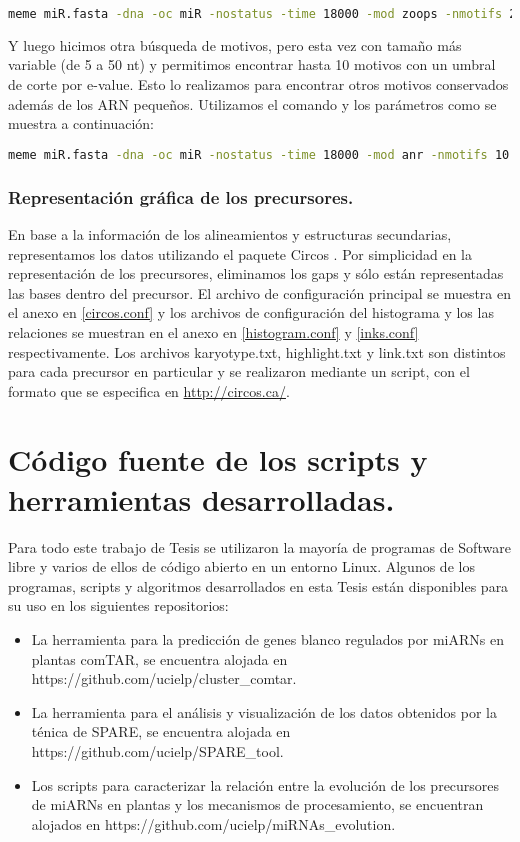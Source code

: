 \begin{lstlisting}[language=bash]
meme miR.fasta -dna -oc miR -nostatus -time 18000 -mod zoops -nmotifs 2 -minw 20 -maxw 23 -revcomp
\end{lstlisting}

Y luego hicimos otra búsqueda de motivos, pero esta vez con tamaño más variable (de 5 a 50 nt) y permitimos encontrar hasta 10 motivos con un umbral de corte por e-value.
Esto lo realizamos para encontrar otros motivos conservados además de los ARN pequeños.
Utilizamos el comando y los parámetros como se muestra a continuación:

\begin{lstlisting}[language=bash]
meme miR.fasta -dna -oc miR -nostatus -time 18000 -mod anr -nmotifs 10 -minw 5 -maxw 50 -revcomp -evt 1e-3
\end{lstlisting}

\subsubsection{Representación gráfica de los precursores.}
En base a la información de los alineamientos y estructuras secundarias, representamos los datos utilizando el paquete Circos \citep{pmid19541911}.
Por simplicidad en la representación de los precursores, eliminamos los gaps y sólo están representadas las bases dentro del precursor. 
El archivo de configuración principal se muestra en el anexo en \ref{circos.conf} y los archivos de configuración del histograma y los las relaciones se muestran en el anexo en \ref{histogram.conf} y \ref{inks.conf} respectivamente. 
Los archivos karyotype.txt, highlight.txt y link.txt son distintos para cada precursor en particular y se realizaron mediante un script, con el formato que se especifica en \url{http://circos.ca/}.

\section{Código fuente de los scripts y herramientas desarrolladas.}
Para todo este trabajo de Tesis se utilizaron la mayoría de programas de Software libre y varios de ellos de código abierto en un entorno Linux.
Algunos de los programas, scripts y algoritmos desarrollados en esta Tesis están disponibles para su uso en los siguientes repositorios:

\begin{itemize}
	\item La herramienta para la predicción de genes blanco regulados por miARNs en plantas comTAR, se encuentra alojada en https://github.com/ucielp/cluster\_comtar.
	\item La herramienta para el análisis y visualización de los datos obtenidos por la ténica de SPARE, se encuentra alojada en https://github.com/ucielp/SPARE\_tool.
	\item Los scripts para caracterizar la relación entre la evolución de los precursores de miARNs en plantas y los mecanismos de procesamiento, se encuentran alojados en https://github.com/ucielp/miRNAs\_evolution.
\end{itemize}


